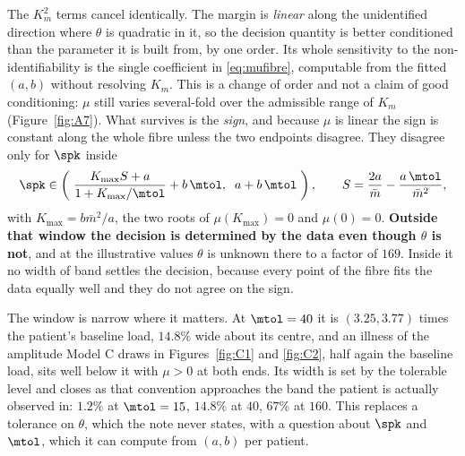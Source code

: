 \begin{enumerate}[leftmargin=*, itemsep=2pt]
      The $K_m^2$ terms cancel identically. The margin is \emph{linear} along the
      unidentified direction where $\theta$ is quadratic in it, so the decision quantity is
      better conditioned than the parameter it is built from, by one order. Its whole
      sensitivity to the non-identifiability is the single coefficient in
      \eqref{eq:mufibre}, computable from the fitted $(a,b)$ without resolving $K_m$.
      This is a change of order and not a claim of good conditioning: $\mu$ still varies
      several-fold over the admissible range of $K_m$ (Figure~\ref{fig:A7}). What survives
      is the \emph{sign}, and because $\mu$ is linear the sign is constant along the whole
      fibre unless the two endpoints disagree. They disagree only for $\spk$ inside
      \begin{equation}
      \spk \in \left(\;\frac{K_{\max} S + a}{1 + K_{\max}/\mtol} + b\,\mtol,
      \;\; a + b\,\mtol \;\right),
      \qquad S = \frac{2a}{\bar m} - \frac{a\,\mtol}{\bar m^{2}},
      \label{eq:window}
      \end{equation}
      with $K_{\max} = b\bar m^{2}/a$, the two roots of $\mu(K_{\max}) = 0$ and
      $\mu(0) = 0$. \textbf{Outside that window the decision is determined by the data even
      though $\theta$ is not}, and at the illustrative values $\theta$ is unknown there to a
      factor of $169$. Inside it no width of band settles the decision, because every point
      of the fibre fits the data equally well and they do not agree on the sign.

      The window is narrow where it matters. At $\mtol = 40$ it is
      $(3.25, 3.77)$ times the patient's baseline load, $14.8\%$ wide about its centre,
      and an illness of the amplitude Model C draws in Figures~\ref{fig:C1} and
      \ref{fig:C2}, half again the baseline load, sits well below it with $\mu > 0$ at
      both ends. Its width is set by the tolerable level and closes as that convention
      approaches the band the patient is actually observed in: $1.2\%$ at $\mtol = 15$,
      $14.8\%$ at $40$, $67\%$ at $160$. This replaces a tolerance on $\theta$, which the
      note never states, with a question about $\spk$ and $\mtol$, which it can compute
      from $(a, b)$ per patient.


\end{enumerate}
